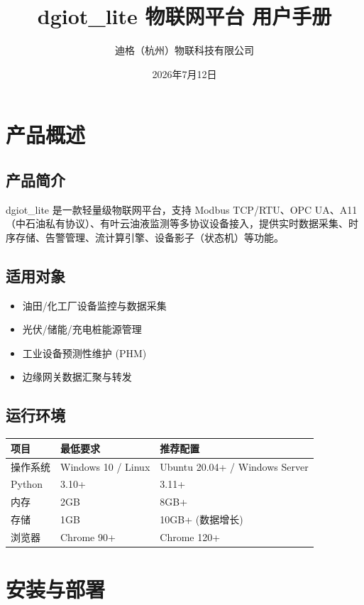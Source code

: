 \documentclass[12pt,a4paper]{ctexart}
\title{\textbf{dgiot\_lite 物联网平台 用户手册}}
\author{迪格（杭州）物联科技有限公司}
\date{2026年7月12日}
\begin{document}
\maketitle
\tableofcontents
\newpage

\section{产品概述}

\subsection{产品简介}
dgiot\_lite 是一款轻量级物联网平台，支持 Modbus TCP/RTU、OPC UA、A11（中石油私有协议）、有叶云油液监测等多协议设备接入，提供实时数据采集、时序存储、告警管理、流计算引擎、设备影子（状态机）等功能。

\subsection{适用对象}
\begin{itemize}[leftmargin=*]
  \item 油田/化工厂设备监控与数据采集
  \item 光伏/储能/充电桩能源管理
  \item 工业设备预测性维护 (PHM)
  \item 边缘网关数据汇聚与转发
\end{itemize}

\subsection{运行环境}
\begin{table}[H]\centering
\begin{tabular}{p{3cm}p{4cm}p{5cm}}
\toprule
\textbf{项目} & \textbf{最低要求} & \textbf{推荐配置} \\
\midrule
操作系统 & Windows 10 / Linux & Ubuntu 20.04+ / Windows Server \\
Python & 3.10+ & 3.11+ \\
内存 & 2GB & 8GB+ \\
存储 & 1GB & 10GB+ (数据增长) \\
浏览器 & Chrome 90+ & Chrome 120+ \\
\bottomrule
\end{tabular}
\end{table}

\section{安装与部署}
\end{document}
